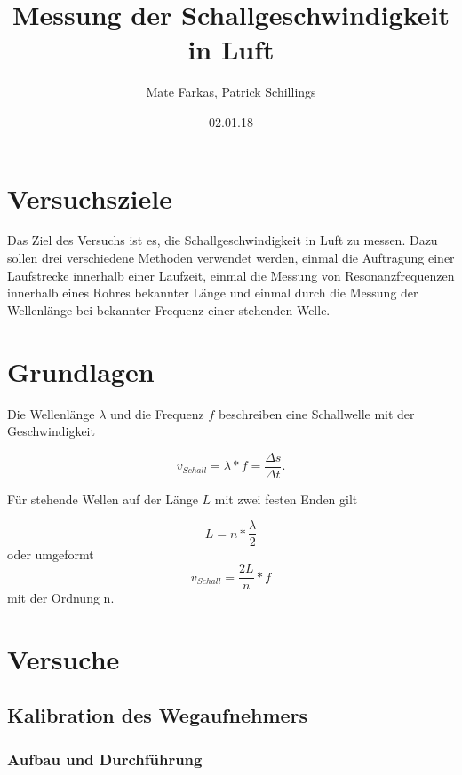 \documentclass[]{article}
\title{Messung der Schallgeschwindigkeit in Luft}
\date{02.01.18}
\author{Mate Farkas, Patrick Schillings}
\begin{document}
	
	
	\tableofcontents
	
	\noindent\makebox[\linewidth]{\rule{\textwidth}{0.4pt}}
	
	\section{Versuchsziele}
	
	Das Ziel des Versuchs ist es, die Schallgeschwindigkeit in Luft zu messen. Dazu sollen drei verschiedene Methoden verwendet werden, einmal die Auftragung einer Laufstrecke innerhalb einer Laufzeit, einmal die Messung von Resonanzfrequenzen innerhalb eines Rohres bekannter Länge und einmal durch die Messung der Wellenlänge bei bekannter Frequenz einer stehenden Welle.
	
	\section{Grundlagen} %
	
	Die Wellenlänge $\lambda$ und die Frequenz $f$ beschreiben eine Schallwelle mit der Geschwindigkeit
	
	\begin{equation}
		v_{Schall}=\lambda*f=\frac{\Delta s}{\Delta t}.
		\label{e1}
	\end{equation}
	
	Für stehende Wellen auf der Länge $L$ mit zwei festen Enden gilt
	
	\begin{equation}
		L=n*\frac{\lambda}{2}
		\label{e2}
	\end{equation}
	oder umgeformt
	\begin{equation}
	v_{Schall}=\frac{2L}{n}*f
	\label{e3} 
	\end{equation}	
	mit der Ordnung n.
	
	
	\section{Versuche}
	
	\subsection{Kalibration des Wegaufnehmers}
	\subsubsection{Aufbau und Durchführung}
	
\end{document}
